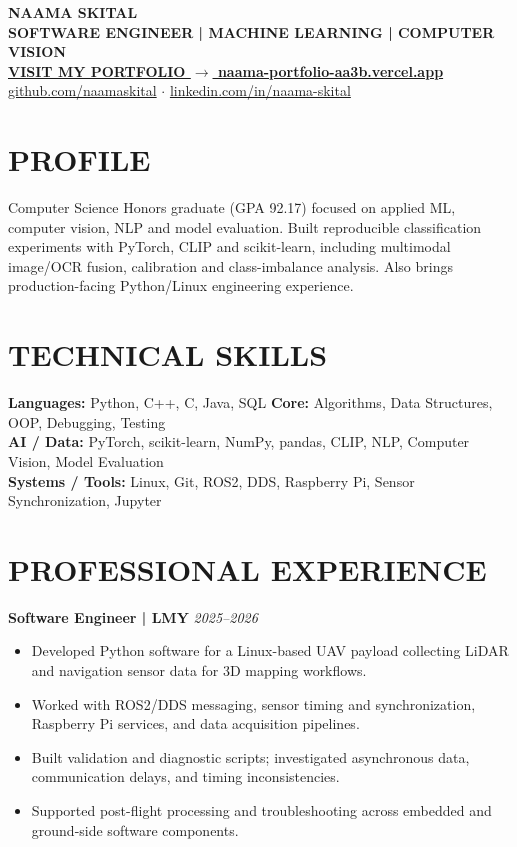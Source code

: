 \documentclass[10pt,a4paper]{article}
\begin{document}
\linespread{0.96}\selectfont
\begin{center}
{\fontsize{23}{26}\selectfont\bfseries\color{navy} NAAMA SKITAL}\\[3pt]
{\color{purple}\bfseries SOFTWARE ENGINEER \quad | \quad MACHINE LEARNING \quad | \quad COMPUTER VISION}\\[5pt]
{\fontsize{13}{16}\selectfont\bfseries\color{portfolioBlue}\href{https://naama-portfolio-aa3b.vercel.app/}{VISIT MY PORTFOLIO  $\longrightarrow$  naama-portfolio-aa3b.vercel.app}}\\[4pt]
\href{https://github.com/naamaskital}{github.com/naamaskital} \quad $\cdot$ \quad \href{https://www.linkedin.com/in/naama-skital/}{linkedin.com/in/naama-skital}
\end{center}
\section*{PROFILE}
Computer Science Honors graduate (GPA 92.17) focused on applied ML, computer vision, NLP and model evaluation. Built reproducible classification experiments with PyTorch, CLIP and scikit-learn, including multimodal image/OCR fusion, calibration and class-imbalance analysis. Also brings production-facing Python/Linux engineering experience.
\section*{TECHNICAL SKILLS}
\textbf{Languages:} Python, C++, C, Java, SQL \quad \textbf{Core:} Algorithms, Data Structures, OOP, Debugging, Testing\\
\textbf{AI / Data:} PyTorch, scikit-learn, NumPy, pandas, CLIP, NLP, Computer Vision, Model Evaluation\\
\textbf{Systems / Tools:} Linux, Git, ROS2, DDS, Raspberry Pi, Sensor Synchronization, Jupyter
\section*{PROFESSIONAL EXPERIENCE}
\textbf{Software Engineer \quad | \quad LMY} \hfill \textit{2025--2026}
\begin{itemize}
\item Developed Python software for a Linux-based UAV payload collecting LiDAR and navigation sensor data for 3D mapping workflows.
\item Worked with ROS2/DDS messaging, sensor timing and synchronization, Raspberry Pi services, and data acquisition pipelines.
\item Built validation and diagnostic scripts; investigated asynchronous data, communication delays, and timing inconsistencies.
\item Supported post-flight processing and troubleshooting across embedded and ground-side software components.
\end{itemize}
\end{document}
